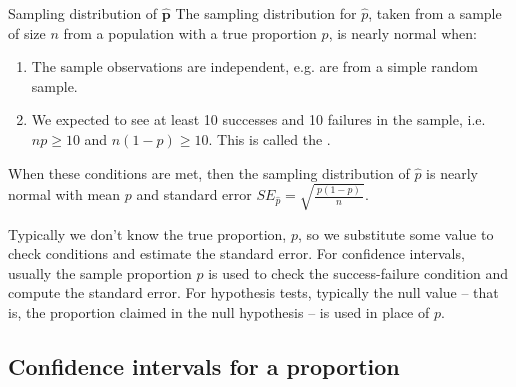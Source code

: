 
\begin{onebox}{Sampling distribution of $\mathbf{\hat{p}}$}
  The sampling distribution for $\hat{p}$, taken from
  a sample of size $n$ from a population with a true
  proportion $p$, is nearly normal when:
  \begin{enumerate}
  \setlength{\itemsep}{0mm}
  \item The sample observations are independent,
      e.g. are from a simple random sample.
  \item We expected to see at least 10 successes and
      10 failures in the sample, i.e. $np\geq10$ and
      $n(1-p)\geq10$.
      This is called the .
  \end{enumerate}
  When these conditions are met, then the sampling
  distribution of $\hat{p}$ is nearly normal with mean
  $p$ and standard error
  $SE_{\hat{p}} = \sqrt{\frac{\ p(1-p)\ }{n}}$.
\end{onebox}

Typically we don't know the true proportion, $p$,
so we substitute some value to check conditions
and estimate the standard error.
For confidence intervals, usually the sample proportion
$\hat{p}$ is used to check the success-failure condition
and compute the standard error.
For hypothesis tests, typically the null value --
that is, the proportion claimed in the null hypothesis --
is used in place of $p$.


\subsection{Confidence intervals for a proportion}
\label{confIntForPropSection}


